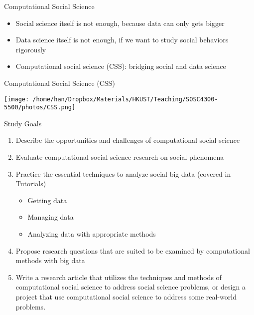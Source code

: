 \documentclass[handout]{beamer}
\begin{document}
\begin{frame}[label={h:23e38fef-d8ab-452f-a9a7-e8d50ca38bfa}]{Computational Social Science}
\begin{itemize}
\item Social science itself is not enough, because data can only gets bigger
\item Data science itself is not enough, if we want to study social behaviors rigorously
\item Computational social science (CSS): bridging social and data science
\end{itemize}
\end{frame}
\begin{frame}[label={h:06fbc80e-a2ee-4e5d-a283-3596856bef36}]{Computational Social Science (CSS)}
\begin{center}
\texttt{[image: /home/han/Dropbox/Materials/HKUST/Teaching/SOSC4300-5500/photos/CSS.png]}
\end{center}
\end{frame}
\begin{frame}[label={h:d3336ac6-87c9-4470-80fe-2ce5006d19c8}]{Study Goals}
\begin{enumerate}
\item Describe the opportunities and challenges of computational social science

\item Evaluate computational social science research on social phenomena

\item Practice the essential techniques to analyze social big data (covered in Tutorials)

\begin{itemize}
\item Getting data
\item Managing data
\item Analyzing data with appropriate methods
\end{itemize}

\item Propose research questions that are suited to be examined by computational methods with big data

\item Write a research article that utilizes the techniques and methods of computational social science to address social science problems, or design a project that use computational social science to address some real-world problems.
\end{enumerate}
\end{frame}
\end{document}
